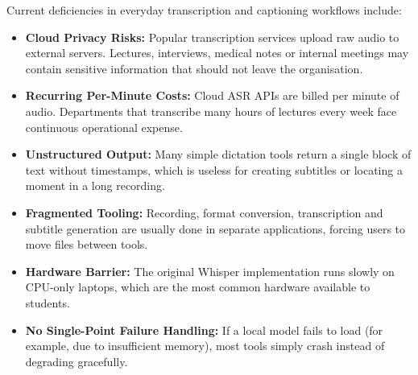 \documentclass[11pt,a4paper]{article}
\begin{document}
Current deficiencies in everyday transcription and captioning workflows include:
\begin{itemize}[leftmargin=1.2em]
  \item \textbf{Cloud Privacy Risks:} Popular transcription services upload raw audio to external servers. Lectures, interviews, medical notes or internal meetings may contain sensitive information that should not leave the organisation.
  \item \textbf{Recurring Per-Minute Costs:} Cloud ASR APIs are billed per minute of audio. Departments that transcribe many hours of lectures every week face continuous operational expense.
  \item \textbf{Unstructured Output:} Many simple dictation tools return a single block of text without timestamps, which is useless for creating subtitles or locating a moment in a long recording.
  \item \textbf{Fragmented Tooling:} Recording, format conversion, transcription and subtitle generation are usually done in separate applications, forcing users to move files between tools.
  \item \textbf{Hardware Barrier:} The original Whisper implementation runs slowly on CPU-only laptops, which are the most common hardware available to students.
  \item \textbf{No Single-Point Failure Handling:} If a local model fails to load (for example, due to insufficient memory), most tools simply crash instead of degrading gracefully.
\end{itemize}
\end{document}
